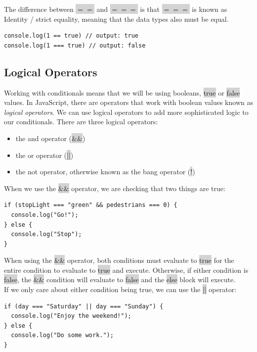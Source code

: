 \documentclass[11pt]{article}
\begin{document}
The difference between \colorbox{lightgray}{$=$$=$} and \colorbox{lightgray}{$=$$=$$=$} is that \colorbox{lightgray}{$=$$=$$=$}  is known as Identity / strict equality, meaning that the data types also must be equal. 
\begin{lstlisting}
console.log(1 == true) // output: true
console.log(1 === true) // output: false
\end{lstlisting}

\subsection{Logical Operators}
Working with conditionals means that we will be using booleans, \colorbox{lightgray}{true} or \colorbox{lightgray}{false} values. In JavaScript, there are operators that work with boolean values known as \textit{logical operators}. We can use logical operators to add more sophisticated logic to our conditionals. There are three logical operators: 
\begin{itemize}[leftmargin = *]
\item the and operator (\colorbox{lightgray}{$\&\&$})
\item the or operator (\colorbox{lightgray}{||})
\item the not operator, otherwise known as the bang operator (\colorbox{lightgray}{!}) 
\end{itemize}
When we use the \colorbox{lightgray}{$\&\&$} operator, we are checking that two things are true:
\begin{lstlisting}
if (stopLight === "green" && pedestrians === 0) {
  console.log("Go!");
} else {
  console.log("Stop");
}
\end{lstlisting}
When using the \colorbox{lightgray}{\&\&} operator, both conditions must evaluate to \colorbox{lightgray}{true} for the entire condition to evaluate to \colorbox{lightgray}{true} and execute. Otherwise, if either condition is \colorbox{lightgray}{false}, the \colorbox{lightgray}{\&\&} condition will evaluate to \colorbox{lightgray}{false} and the \colorbox{lightgray}{else} block will execute. \\
\newline
If we only care about either condition being true, we can use the \colorbox{lightgray}{||} operator:
\begin{lstlisting}
if (day === "Saturday" || day === "Sunday") {
  console.log("Enjoy the weekend!");
} else {
  console.log("Do some work.");
}
\end{lstlisting}
\end{document}
